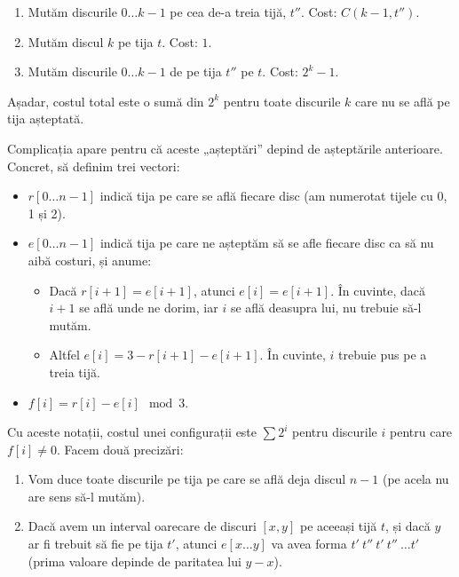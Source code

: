 \documentclass[../main.tex]{subfiles}
\begin{document}
\begin{enumerate}
  \item Mutăm discurile $0 \dots k-1$ pe cea de-a treia tijă, $t''$. Cost: $C(k - 1, t'')$.

  \item Mutăm discul $k$ pe tija $t$. Cost: $1$.

  \item Mutăm discurile $0 \dots k-1$ de pe tija $t''$ pe $t$. Cost: $2^k - 1$.
\end{enumerate}
Așadar, costul total este o sumă din $2^k$ pentru toate discurile $k$ care nu se află pe tija așteptată.

Complicația apare pentru că aceste „așteptări” depind de așteptările anterioare. Concret, să definim trei vectori:

\begin{itemize}
  \item $r[0 \dots n - 1]$ indică tija pe care se află fiecare disc (am numerotat tijele cu 0, 1 și 2).

  \item $e[0 \dots n - 1]$ indică tija pe care ne așteptăm să se afle fiecare disc ca să nu aibă costuri, și anume:

  \begin{itemize}
    \item Dacă $r[i + 1] = e[i + 1]$, atunci $e[i] = e[i + 1]$. În cuvinte, dacă $i+1$ se află unde ne dorim, iar $i$ se află deasupra lui, nu trebuie să-l mutăm.

    \item Altfel $e[i] = 3 - r[i + 1] - e[i + 1]$. În cuvinte, $i$ trebuie pus pe a treia tijă.
  \end{itemize}

  \item $f[i] = r[i] - e[i] \mod 3$.
\end{itemize}

Cu aceste notații, costul unei configurații este $\sum 2^i$ pentru discurile $i$ pentru care $f[i] \neq 0$. Facem două precizări:

\begin{enumerate}
  \item Vom duce toate discurile pe tija pe care se află deja discul $n-1$ (pe acela nu are sens să-l mutăm).

  \item Dacă avem un interval oarecare de discuri $[x, y]$ pe aceeași tijă $t$, și dacă $y$ ar fi trebuit să fie pe tija $t'$, atunci $e[x \dots y]$ va avea forma $t'\ t''\ t'\ t''\ \dots t'$ (prima valoare depinde de paritatea lui $y-x$).
\end{enumerate}
\end{document}
